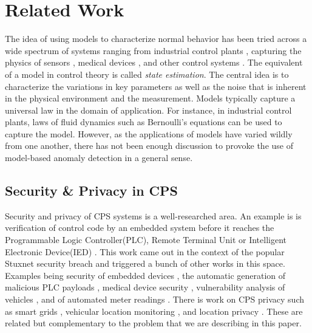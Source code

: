 \section{Related Work}
The idea of using models to characterize normal behavior has been tried across a wide spectrum of systems ranging from industrial control plants \cite{wang2014srid}, capturing the physics of sensors \cite{shoukry2015pycra}, medical devices \cite{hei2013pipac}, and other control systems \cite{mclaughlin2013cps}. The equivalent of a model in control theory is called \textit{state estimation}. The central idea is to characterize the variations in key parameters as well as the noise that is inherent in the physical environment and the measurement. Models typically capture a universal law in the domain of application. For instance, in industrial control plants, laws of fluid dynamics such as Bernoulli's equations can be used to capture the model. However, as the applications of models have varied wildly from one another, there has not been enough discussion to provoke the use of model-based anomaly detection in a general sense. \\

\subsection{Security \& Privacy in CPS} Security and privacy of CPS systems is a well-researched area. An example is is verification of control code by an embedded system before it reaches the Programmable Logic Controller(PLC), Remote Terminal Unit or Intelligent Electronic Device(IED) \cite{mclaughlin2014trusted}. This work came out in the context of the popular Stuxnet \cite{falliere2011w32} security breach and triggered a bunch of other works in this space. Examples being security of embedded devices \cite{lemay2009cumulative}, the automatic generation of malicious PLC payloads \cite{mclaughlin2012sabot}, medical device security \cite{rushanan2014sok}, vulnerability analysis of vehicles \cite{checkoway2011comprehensive}, and of automated meter readings \cite{rouf2012neighborhood}. There is work on CPS privacy such as smart grids \cite{jawurek2012sok}, vehicular location monitoring \cite{hoh2008virtual}, and location privacy \cite{shokri2011quantifying}. These are related but complementary to the problem that we are describing in this paper. 

